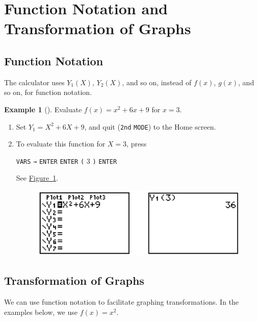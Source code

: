 \documentclass[10pt,]{book}
\theoremstyle{plain}
\theoremstyle{definition}
\theoremstyle{definition}
\newtheorem{example}[theorem]{Example}
\theoremstyle{definition}
\numberwithin{equation}{part}
\begin{document}
\section[{Function Notation and Transformation of Graphs}]{Function Notation and Transformation of Graphs}\label{appendix-Function-Notation-and-Transformation-of-Graphs}
\typeout{************************************************}
\typeout{************************************************}
\subsection[{Function Notation}]{Function Notation}\label{subsection-87}
The calculator uses \(Y_1 (X)\), \(Y_2 (X)\), and so on, instead of \(f (x)\), \(g(x)\), and so on, for function notation.%
\begin{example}[]\label{example-118}
Evaluate \(f (x) = x^2 + 6x + 9\) for \(x = 3\). \leavevmode%
\begin{enumerate}[label=*\arabic**]
\item\hypertarget{li-452}{}Set \(Y_1 = X^2 + 6X + 9\), and quit (\lstinline?2nd? \lstinline?MODE?) to the Home screen.%
\item\hypertarget{li-453}{}To evaluate this function for \(X = 3\), press%
\par
\lstinline?VARS? \lstinline?→? \lstinline?ENTER? \lstinline?ENTER? \lstinline?(? \(3\) \lstinline?)? \lstinline?ENTER?%
\par
See \hyperref[fig-GC-evaluate-function]{Figure~\ref{fig-GC-evaluate-function}}. \leavevmode%
\begin{figure}
\centering
\includegraphics[width=0.6\linewidth]{images/fig-GC-evaluate-function.jpg}
\caption{\label{fig-GC-evaluate-function}}
\end{figure}
%
\end{enumerate}
%
\end{example}
\typeout{************************************************}
\typeout{************************************************}
\subsection[{Transformation of Graphs}]{Transformation of Graphs}\label{subsection-88}
We can use function notation to facilitate graphing transformations. In the examples below, we use \(f (x) = x^2\).%
\typeout{************************************************}
\typeout{************************************************}
\end{document}
